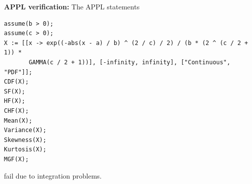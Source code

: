\documentclass[12pt,fullpage]{article}
\begin{document}
\vspace{0.1in}
\newpage
\noindent
{\bf APPL verification:}
The APPL statements
\begin{verbatim}
assume(b > 0);
assume(c > 0);
X := [[x -> exp((-abs(x - a) / b) ^ (2 / c) / 2) / (b * (2 ^ (c / 2 + 1)) *
       GAMMA(c / 2 + 1))], [-infinity, infinity], ["Continuous", "PDF"]];
CDF(X);
SF(X);
HF(X);
CHF(X);
Mean(X);
Variance(X);
Skewness(X);
Kurtosis(X);
MGF(X);
\end{verbatim}
fail due to integration problems.
\end{document}
